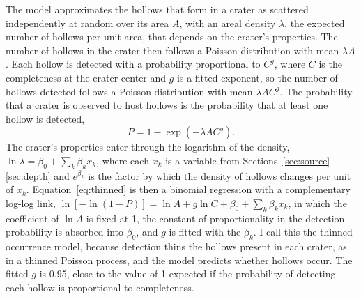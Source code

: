 \documentclass[article,review]{planetary}
\begin{document}
The model approximates the hollows that form in a crater as scattered independently at random over its area $A$, with an areal density $\lambda$, the expected number of hollows per unit area, that depends on the crater's properties. The number of hollows in the crater then follows a Poisson distribution with mean $\lambda A$. Each hollow is detected with a probability proportional to $C^{g}$, where $C$ is the completeness at the crater center and $g$ is a fitted exponent, so the number of hollows detected follows a Poisson distribution with mean $\lambda A C^{g}$. The probability that a crater is observed to host hollows is the probability that at least one hollow is detected,
\begin{equation}
    P = 1 - \exp\left(-\lambda A C^{g}\right).
    \label{eq:thinned}
\end{equation}
The crater's properties enter through the logarithm of the density, $\ln\lambda = \beta_0 + \sum_k \beta_k x_k$, where each $x_k$ is a variable from Sections~\ref{sec:source}--\ref{sec:depth} and $e^{\beta_k}$ is the factor by which the density of hollows changes per unit of $x_k$. Equation~\ref{eq:thinned} is then a binomial regression with a complementary log-log link, $\ln[-\ln(1-P)] = \ln A + g \ln C + \beta_0 + \sum_k \beta_k x_k$, in which the coefficient of $\ln A$ is fixed at 1, the constant of proportionality in the detection probability is absorbed into $\beta_0$, and $g$ is fitted with the $\beta_k$. I call this the thinned occurrence model, because detection thins the hollows present in each crater, as in a thinned Poisson process, and the model predicts whether hollows occur. The fitted $g$ is 0.95, close to the value of 1 expected if the probability of detecting each hollow is proportional to completeness.
\end{document}
